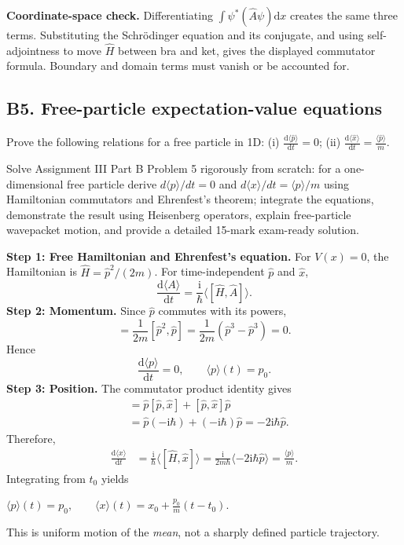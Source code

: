 \documentclass[11pt,a4paper]{article}
\newcommand{\key}[1]{\begin{resultbox}\centering\(\displaystyle #1\)\end{resultbox}}
\newcommand{\dd}{\mathrm{d}}\newcommand{\iu}{\mathrm{i}}\newcommand{\ee}{\mathrm{e}}
\newcommand{\avg}[1]{\langle #1\rangle}\newcommand{\Sch}{Schr\"odinger}
\begin{document}
\textbf{Coordinate-space check.} Differentiating \(\int\psi^*(\hat A\psi)\dd x\) creates the same three terms. Substituting the Schr\"odinger equation and its conjugate, and using self-adjointness to move \(\hat H\) between bra and ket, gives the displayed commutator formula. Boundary and domain terms must vanish or be accounted for.

\subsection{B5. Free-particle expectation-value equations}
\begin{questionbox}
Prove the following relations for a free particle in 1D: (i) \(\frac{\dd\langle\hat p\rangle}{\dd t}=0\); (ii) \(\frac{\dd\langle\hat x\rangle}{\dd t}=\frac{\langle\hat p\rangle}{m}\).
\end{questionbox}
\begin{studybox}
Solve Assignment III Part B Problem 5 rigorously from scratch: for a one-dimensional free particle derive \(d\langle p\rangle/dt=0\) and \(d\langle x\rangle/dt=\langle p\rangle/m\) using Hamiltonian commutators and Ehrenfest's theorem; integrate the equations, demonstrate the result using Heisenberg operators, explain free-particle wavepacket motion, and provide a detailed 15-mark exam-ready solution.
\end{studybox}
\textbf{Step 1: Free Hamiltonian and Ehrenfest's equation.} For \(V(x)=0\), the Hamiltonian is \(\hat H=\hat p^2/(2m)\). For time-independent \(\hat p\) and \(\hat x\),
\begin{equation}\frac{\dd\avg A}{\dd t}=\frac{\iu}{\hbar}\avg{[\hat H,\hat A]}.\end{equation}
\textbf{Step 2: Momentum.} Since \(\hat p\) commutes with its powers,
\begin{equation}[\hat H,\hat p]=\frac1{2m}[\hat p^2,\hat p]=\frac1{2m}(\hat p^3-\hat p^3)=0.\end{equation}
Hence
\begin{equation}\boxed{\frac{\dd\avg p}{\dd t}=0,\qquad\avg p(t)=p_0.}\end{equation}
\textbf{Step 3: Position.} The commutator product identity gives
\begin{align}
[\hat p^2,\hat x]&=\hat p[\hat p,\hat x]+[\hat p,\hat x]\hat p\\
&=\hat p(-\iu\hbar)+(-\iu\hbar)\hat p=-2\iu\hbar\hat p.
\end{align}
Therefore,
\begin{align}
\frac{\dd\avg x}{\dd t}&=\frac{\iu}{\hbar}\avg{[\hat H,\hat x]}=\frac{\iu}{2m\hbar}\avg{-2\iu\hbar\hat p}=\frac{\avg p}{m}.
\end{align}
Integrating from \(t_0\) yields
\key{\boxed{\avg p(t)=p_0,\qquad\avg x(t)=x_0+\frac{p_0}{m}(t-t_0).}}
This is uniform motion of the \emph{mean}, not a sharply defined particle trajectory.
\end{document}
